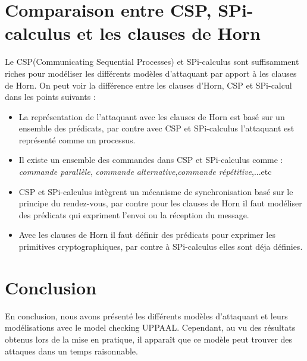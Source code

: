 \documentclass[10pt,a4paper]{article}
\begin{document}
\section{Comparaison entre CSP, SPi-calculus et les clauses de Horn}
Le CSP(Communicating Sequential Processes) et SPi-calculus sont suffisamment riches pour modéliser les différents modèles d'attaquant par apport à les clauses de Horn. On peut voir la différence entre les clauses d'Horn, CSP et SPi-calcul dans les points suivants :\newline

\begin{itemize}
\item La représentation de l’attaquant avec les clauses de Horn est basé sur un ensemble des prédicats, par contre avec CSP et SPi-calculus l’attaquant est représenté comme un processus.
\item Il existe un ensemble des commandes dans CSP et SPi-calculus comme : \textit{commande parallèle}, \textit{commande alternative},\textit{commande répétitive},...etc
\item CSP et SPi-calculus intègrent un mécanisme de synchronisation basé sur le principe du rendez-vous, par contre pour les clauses de Horn il faut modéliser des prédicats qui expriment l'envoi ou la réception du message.
\item Avec les clauses de Horn il faut définir des prédicats pour exprimer les primitives cryptographiques, par contre à SPi-calculus elles sont déja définies.
\end{itemize}


\section{Conclusion}
En conclusion, nous avons présenté les différents modèles d'attaquant et leurs modélisations avec le model checking UPPAAL. Cependant, au vu des résultats obtenus lors de la mise en pratique, il appara\^{i}t que ce modèle peut trouver des attaques dans un temps raisonnable.
\newpage


\end{document}
